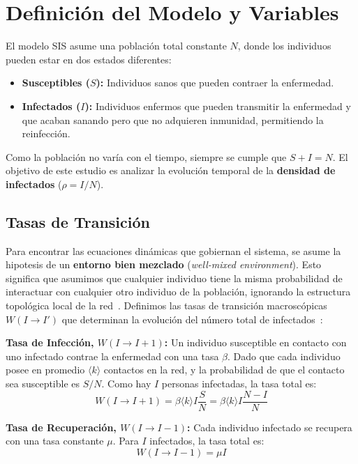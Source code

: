 \documentclass[%
reprint,
amsmath,amssymb,
aps,
]{revtex4-2}
\begin{document}
	\section{Definición del Modelo y Variables}
	El modelo SIS asume una población total constante $N$, donde los individuos pueden estar en dos estados diferentes:
	\begin{itemize}
		\item \textbf{Susceptibles ($S$):} Individuos sanos que pueden contraer la enfermedad.
		\item \textbf{Infectados ($I$):} Individuos enfermos que pueden transmitir la enfermedad y que acaban sanando pero que no adquieren inmunidad, permitiendo la reinfección.
	\end{itemize}
	
	Como la población no varía con el tiempo, siempre se cumple que $S + I = N$. El objetivo de este estudio es analizar la evolución temporal de la \textbf{densidad de infectados} ($\rho = I/N$).~\cite{PastorSatorras2015}
	
	\subsection{Tasas de Transición}\label{sec:tasas_trans}
	Para encontrar las ecuaciones dinámicas que gobiernan el sistema, se asume la hipotesis de un \textbf{entorno bien mezclado} (\textit{well-mixed environment}). Esto significa que asumimos que cualquier individuo tiene la misma probabilidad de interactuar con cualquier otro individuo de la población, ignorando la estructura topológica local de la red~\cite{PastorSatorras2015,Albert2002}.
	Definimos las tasas de transición macroscópicas $W(I \to I')$ que determinan la evolución del número total de infectados~\cite{Roig2026}:
	
	\textbf{Tasa de Infección, $W(I \to I+1)$:} Un individuo susceptible en contacto con uno infectado contrae la enfermedad con una tasa $\beta$. Dado que cada individuo posee en promedio $\langle k \rangle$ contactos en la red, y la probabilidad de que el contacto sea susceptible es $S/N$. Como hay $I$ personas infectadas, la tasa total es:
	\begin{equation}
		W(I \to I+1) = \beta \langle k \rangle I \frac{S}{N} = \beta \langle k \rangle I \frac{N - I}{N}
	\end{equation}
	
	\textbf{Tasa de Recuperación, $W(I \to I-1)$:} Cada individuo infectado se recupera con una tasa constante $\mu$. Para $I$ infectados, la tasa total es:
	\begin{equation}
		W(I \to I-1) = \mu I
	\end{equation}
	
\end{document}
